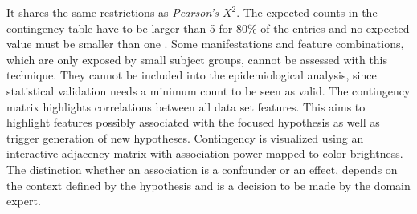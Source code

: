 \documentclass[journal]{style/vgtc} 			          %
\begin{document}
It shares the same restrictions as \emph{Pearson's $X^2$}.
%
The expected counts in the contingency table have to be larger than 5 for $80\%$ of the entries and no expected value must be smaller than one \cite{Cochran1952}.
%
Some manifestations and feature combinations, which are only exposed by small subject groups, cannot be assessed with this technique.
%
They cannot be included into the epidemiological analysis, since statistical validation needs a minimum count to be seen as valid.
%
The contingency matrix highlights correlations between all data set features. %
%
This aims to highlight features possibly associated with the focused hypothesis as well as trigger generation of new hypotheses.
%
Contingency is visualized using an interactive adjacency matrix with association power mapped to color brightness.
%
The distinction whether an association is a confounder or an effect, depends on the context defined by the hypothesis and is a decision to be made by the domain expert.
% 
\end{document}
